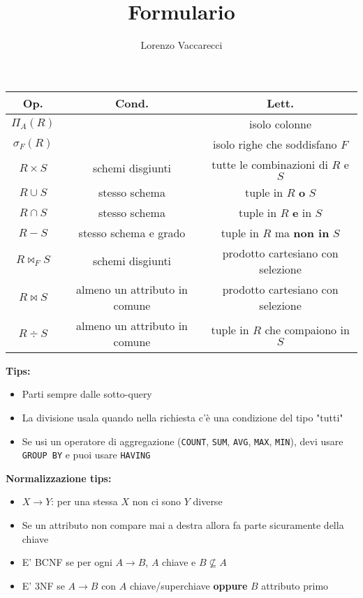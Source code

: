 \documentclass[10pt]{article}
\author{Lorenzo Vaccarecci}
\title{Formulario}
\date{}
\begin{document}
\maketitle
\begin{table}[h]
    \centering
    \begin{tabular}{|c|c|c|}
        \hline
        \textbf{Op.} & \textbf{Cond.} & \textbf{Lett.}\\
        \hline
        $\Pi_{A}(R)$ &  & isolo colonne\\
        $\sigma_{F}(R)$ &  & isolo righe che soddisfano $F$\\
        $R \times S$ & schemi disgiunti & tutte le combinazioni di $R$ e $S$\\
        $R \cup S$ & stesso schema & tuple in $R$ \textbf{o} $S$\\
        $R \cap S$ & stesso schema & tuple in $R$ \textbf{e} in $S$\\
        $R - S$ & stesso schema e grado & tuple in $R$ ma \textbf{non in} $S$\\
        $R \bowtie_{F} S$ & schemi disgiunti & prodotto cartesiano con selezione\\
        $R \bowtie S$ & almeno un attributo in comune & prodotto cartesiano con selezione\\
        $R \div S$ & almeno un attributo in comune & tuple in $R$ che compaiono in $S$\\
        \hline
    \end{tabular}
\end{table}
\textbf{Tips:}
\begin{itemize}
    \item Parti sempre dalle sotto-query
    \item La divisione usala quando nella richiesta c'è una condizione del tipo "tutti"
    \item Se usi un operatore di aggregazione (\texttt{COUNT}, \texttt{SUM}, \texttt{AVG}, \texttt{MAX}, \texttt{MIN}), devi usare \texttt{GROUP BY} e puoi usare \texttt{HAVING}
\end{itemize}
\textbf{Normalizzazione tips:}
\begin{itemize}
    \item $X \rightarrow Y$: per una stessa $X$ non ci sono $Y$ diverse
    \item Se un attributo non compare mai a destra allora fa parte sicuramente della chiave
    \item E' BCNF se per ogni $A\rightarrow B$, $A$ chiave e $B \nsubseteq A$
    \item E' 3NF se $A\rightarrow B$ con $A$ chiave/superchiave \textbf{oppure} $B$ attributo primo
\end{itemize}
\end{document}
